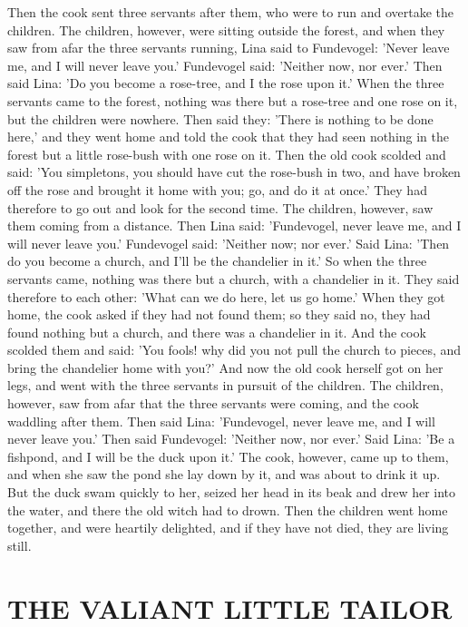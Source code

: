\documentclass[12pt]{book}
\begin{document}
Then the cook sent three servants after them, who were to run and
overtake the children. The children, however, were sitting outside the
forest, and when they saw from afar the three servants running, Lina
said to Fundevogel: 'Never leave me, and I will never leave you.'
Fundevogel said: 'Neither now, nor ever.' Then said Lina: 'Do you
become a rose-tree, and I the rose upon it.' When the three servants
came to the forest, nothing was there but a rose-tree and one rose on
it, but the children were nowhere. Then said they: 'There is nothing
to be done here,' and they went home and told the cook that they had
seen nothing in the forest but a little rose-bush with one rose on it.
Then the old cook scolded and said: 'You simpletons, you should have
cut the rose-bush in two, and have broken off the rose and brought it
home with you; go, and do it at once.' They had therefore to go out
and look for the second time. The children, however, saw them coming
from a distance. Then Lina said: 'Fundevogel, never leave me, and I
will never leave you.' Fundevogel said: 'Neither now; nor ever.' Said
Lina: 'Then do you become a church, and I'll be the chandelier in it.'
So when the three servants came, nothing was there but a church, with
a chandelier in it. They said therefore to each other: 'What can we do
here, let us go home.' When they got home, the cook asked if they had
not found them; so they said no, they had found nothing but a church,
and there was a chandelier in it. And the cook scolded them and said:
'You fools! why did you not pull the church to pieces, and bring the
chandelier home with you?' And now the old cook herself got on her
legs, and went with the three servants in pursuit of the children. The
children, however, saw from afar that the three servants were coming,
and the cook waddling after them. Then said Lina: 'Fundevogel, never
leave me, and I will never leave you.' Then said Fundevogel: 'Neither
now, nor ever.' Said Lina: 'Be a fishpond, and I will be the duck upon
it.' The cook, however, came up to them, and when she saw the pond she
lay down by it, and was about to drink it up. But the duck swam
quickly to her, seized her head in its beak and drew her into the
water, and there the old witch had to drown. Then the children went
home together, and were heartily delighted, and if they have not died,
they are living still.



\chapter{THE VALIANT LITTLE TAILOR}
\end{document}
